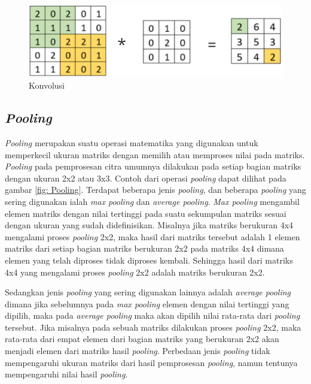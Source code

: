 \begin{figure}[h!]
    \begin{center}
      \includegraphics[width= 0.7\linewidth]{bab2/Convolution.png}
      \caption{Konvolusi}
      \label{fig: Konvolusi}
    \end{center}
\end{figure}

\subsection{\textit{Pooling}}
\textit{Pooling} merupakan suatu operasi matematika yang digunakan untuk memperkecil ukuran matriks dengan memilih
atau memproses nilai pada matriks. \textit{Pooling} pada pemprosesan citra umumnya dilakukan pada setiap bagian matriks
dengan ukuran 2x2 atau 3x3. Contoh dari operasi \textit{pooling} dapat dilihat pada gambar \ref{fig: Pooling}.
Terdapat beberapa jenis \textit{pooling}, dan beberapa \textit{pooling} yang sering digunakan ialah
\textit{max pooling} dan \textit{average pooling}. \textit{Max pooling} mengambil elemen matriks dengan
nilai tertinggi pada suatu sekumpulan matriks sesuai dengan ukuran yang sudah didefinisikan. Misalnya 
jika matriks berukuran 4x4 mengalami proses \textit{pooling} 2x2, maka hasil dari matriks tersebut adalah
1 elemen matriks dari setiap bagian matriks berukuran 2x2 pada matriks 4x4 dimana elemen yang telah diproses
tidak diproses kembali. Sehingga hasil dari matriks 4x4 yang mengalami proses \textit{pooling} 2x2
adalah matriks berukuran 2x2.

Sedangkan jenis \textit{pooling} yang sering digunakan lainnya adalah \textit{average pooling}
dimana jika sebelumnya pada \textit{max pooling} elemen dengan nilai tertinggi yang dipilih, maka
pada \textit{average pooling} maka akan dipilih nilai rata-rata dari \textit{pooling} tersebut. Jika
misalnya pada sebuah matriks dilakukan proses \textit{pooling} 2x2, maka rata-rata dari empat elemen
dari bagian matriks yang berukuran 2x2 akan menjadi elemen dari matriks hasil \textit{pooling}. Perbedaan 
jenis \textit{pooling} tidak mempengaruhi ukuran matriks dari hasil pemprosesan \textit{pooling}, namun
tentunya mempengaruhi nilai hasil \textit{pooling}.

